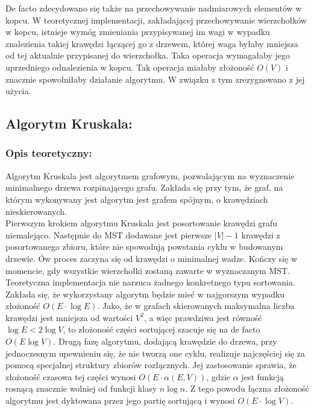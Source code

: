 \documentclass[a4paper,12pt]{article}
\begin{document}
\noindent
De facto zdecydowano się także na przechowywanie nadmiarowych elementów w kopcu. W teoretycznej implementacji, zakładającej przechowywanie wierzchołków w kopcu, istnieje wymóg zmieniania przypisywanej im wagi w wypadku znalezienia takiej krawędzi łączącej go z drzewem, której waga byłaby mniejsza od tej aktualnie przypisanej do wierzchołka. Taka operacja wymagałaby jego uprzedniego odnalezienia w kopcu. Tak operacja miałaby złożoność $O(V)$ i znacznie spowolniłaby działanie algorytmu. W związku z tym zrezygnowano z jej użycia.

\subsection{Algorytm Kruskala:}

\subsubsection{Opis teoretyczny:}
Algorytm Kruskala jest algorytmem grafowym, pozwalającym na wyznaczenie minimalnego drzewa rozpinającego grafu. Zakłada się przy tym, że graf, na którym wykonywany jest algorytm jest grafem spójnym, o krawędziach nieskierowanych.\\

\noindent
Pierwszym krokiem algorytmu Kruskala jest posortowanie krawędzi grafu niemalejąco. Następnie do MST dodawane jest pierwsze $|V|-1$ krawędzi z posortowanego zbioru, które nie spowodują powstania cyklu w budowanym drzewie. Ów proces zaczyna się od krawędzi o minimalnej wadze. Kończy się w momencie, gdy wszystkie wierzchołki zostaną zawarte w wyznaczanym MST. \\

\noindent
Teoretyczna implementacja nie narzuca żadnego konkretnego typu sortowania. Zakłada się, że wykorzystany algorytm będzie mieć w najgorszym wypadku złożoność $O(E \cdot \log E)$. Jako, że w grafach skierowanych maksymalna liczba krawędzi jest mniejsza od wartości $V^2$, a więc prawdziwa jest równość $\log E < 2\log V$, to złożoność części sortującej szacuje się na de facto $O (E \log V)$. Drugą fazę algorytmu, dodającą krawędzie do drzewa, przy jednoczesnym upewnieniu się, że nie tworzą one cyklu, realizuje najczęściej się za pomocą specjalnej struktury zbiorów rozłącznych. Jej zastosowanie sprawia, że złożoność czasowa tej części wynosi $O(E \cdot \alpha(E,V))$, gdzie $\alpha$ jest funkcją rosnącą znacznie wolniej od funkcji klasy $n \log n$. Z tego powodu łączna złożoność algorytmu jest dyktowana przez jego partię sortującą i wynosi $O (E \cdot \log V)$.
\end{document}
